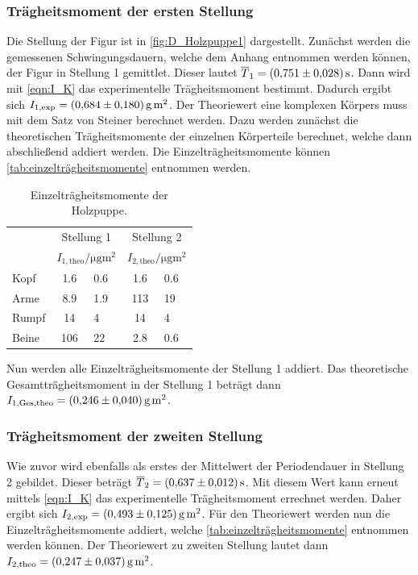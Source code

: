 \begin{figure}
\begin{subfigure}{0.48\textwidth}
  \end{subfigure}    
\end{figure}

\subsubsection{Trägheitsmoment der ersten Stellung}
\label{subsubsec:A_ballet}
Die Stellung der Figur ist in \autoref{fig:D_Holzpuppe1} dargestellt. Zunächst werden die gemessenen Schwingungsdauern, welche dem Anhang entnommen werden können, der Figur in Stellung 1 gemittlet.
Dieser lautet $\overline{T}_1 = \qty{0.751+-0.028}{\second}$. 
Dann wird mit \autoref{eqn:I_K} das experimentelle Trägheitsmoment bestimmt. Dadurch ergibt sich $I_{1,\text{exp}} = \qty{0.684+-0.180}{\gram\metre\squared}$. Der Theoriewert eine komplexen
Körpers muss mit dem Satz von Steiner berechnet werden. Dazu werden zunächst die theoretischen Trägheitsmomente der einzelnen Körperteile berechnet, welche dann abschließend addiert werden.
Die Einzelträgheitsmomente können \autoref{tab:einzelträgheitsmomente} entnommen werden.
\begin{table}
  \centering
  \caption{Einzelträgheitsmomente der Holzpuppe.} 
  \label{tab:einzelträgheitsmomente}
  \begin{tabular}{l c @{${}\pm{}$} l c @{${}\pm{}$} l}
      \toprule
      & \multicolumn{2}{c}{Stellung 1} & \multicolumn{2}{c}{Stellung 2} \\
      \cmidrule(lr){2-3}\cmidrule(lr){4-5}
       & \multicolumn{2}{c}{$\unit{I_{1,\text{theo}}\per\micro\gram\metre\squared}$} & \multicolumn{2}{c}{$\unit{I_{2,\text{theo}}\per\micro\gram\metre\squared}$} \\
      \midrule
      {Kopf} & 1.6 & 0.6 & 1.6 & 0.6 \\
      {Arme} & 8.9 & 1.9 & 113 & 19 \\
      {Rumpf} & 14 & 4 & 14 & 4 \\
      {Beine} & 106 & 22 & 2.8 & 0.6 \\
      \bottomrule 
  \end{tabular}
\end{table}
Nun werden alle Einzelträgheitsmomente der Stellung 1 addiert. Das theoretische Gesamtträgheitsmoment in der Stellung 1 beträgt dann $I_{1,\text{Ges},\text{theo}} = \qty{0.246+-0.040}{\gram\metre\squared}$.
\subsubsection{Trägheitsmoment der zweiten Stellung}
\label{subsubsec:A_tpose}
Wie zuvor wird ebenfalls als erstes der Mittelwert der Periodendauer in Stellung 2 gebildet. Dieser beträgt $\overline{T}_2 = \qty{0.637+-0.012}{\second}$. Mit diesem Wert kann erneut mittels \autoref{eqn:I_K}
das experimentelle Trägheitsmoment errechnet werden. Daher ergibt sich $I_{2,\text{exp}} = \qty{0.493+-0.125}{\gram\metre\squared}$. Für den Theoriewert werden nun die Einzelträgheitsmomente addiert, 
welche \autoref{tab:einzelträgheitsmomente} entnommen werden können. Der Theoriewert zu zweiten Stellung lautet dann $I_{2,\text{theo}} = \qty{0.247+-0.037}{\gram\metre\squared}$.
